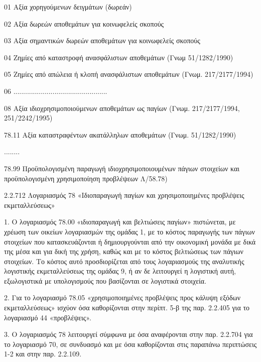 \documentclass[A4,10pt,greek]{book}
\begin{document}
                               01    Αξία χορηγούμενων δειγμάτων (δωρεάν) 

                               02    Αξία δωρεών αποθεμάτων για κοινωφελείς σκοπούς

                               03    Αξία σημαντικών δωρεών αποθεμάτων για κοινωφελείς
                                       σκοπούς

                               04    Ζημίες από καταστροφή ανασφάλιστων αποθεμάτων
                                       (Γνωμ 51/1282/1990)

                               05    Ζημίες από απώλεια ή κλοπή ανασφάλιστων αποθεμάτων
                                       (Γνωμ. 217/2177/1994)

                               06    ................................................

                               08    Αξία ιδιοχρησιμοποιούμενων αποθεμάτων ως παγίων
                                       (Γνωμ. 217/2177/1994, 251/2242/1995)

        78.11    Αξία καταστραφέντων ακατάλληλων αποθεμάτων
                        (Γνωμ. 51/1282/1990)

        ........

        78.99    Προϋπολογισμένη παραγωγή ιδιοχρησιμοποιουμένων πάγιων
                     στοιχείων και προϋπολογισμένη χρησιμοποίηση προβλέψεων Λ/58.78)

2.2.712 Λογαριασμός 78 «Ιδιοπαραγωγή παγίων και χρησιμοποιημένες προβλέψεις εκμεταλλεύσεως»

1. Ο λογαριασμός 78.00 «ιδιοπαραγωγή και βελτιώσεις παγίων» πιστώνεται, με χρέωση των οικείων λογαριασμών της ομάδας 1, με το κόστος παραγωγής των πάγιων στοιχείων που κατασκευάζονται ή δημιουργούνται από την οικονομική μονάδα με δικά της μέσα και για δική της χρήση, καθώς και με το κόστος βελτιώσεως των πάγιων στοιχείων. Το κόστος αυτό προσδιορίζεται από τους λογαριασμούς της αναλυτικής λογιστικής εκμεταλλεύσεως της ομάδας 9, ή αν δε λειτουργεί η λογιστική αυτή, εξωλογιστικά με υπολογισμούς που βασίζονται σε λογιστικά στοιχεία.

2. Για το λογαριασμό 78.05 «χρησιμοποιημένες προβλέψεις προς κάλυψη εξόδων εκμεταλλεύσεως» ισχύον όσα καθορίζονται στην περίπτ. 5-β της παρ. 2.2.405 για το λογαριασμό 44 «προβλέψεις».

3. Ο λογαριασμός 78 λειτουργεί σύμφωνα με όσα αναφέρονται στην παρ. 2.2.704 για το λογαριασμό 70, σε συνδυασμό και με όσα καθορίζονται στις παραπάνω περιπτώσεις 1-2 και στην παρ. 2.2.109.
\end{document}
